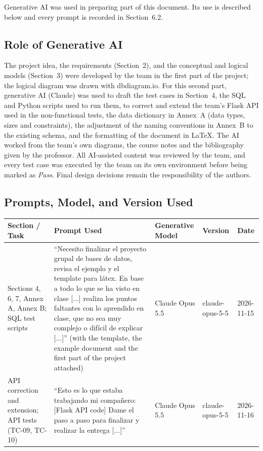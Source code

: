 \documentclass[11pt]{article}
\renewcommand{\_}{\oldunderscore\allowbreak}
\begin{document}
Generative AI was used in preparing part of this document. Its use is described below and every prompt is recorded in Section~6.2.

\subsection{Role of Generative AI}
The project idea, the requirements (Section~2), and the conceptual and logical models (Section~3) were developed by the team in the first part of the project; the logical diagram was drawn with dbdiagram.io. For this second part, generative AI (Claude) was used to draft the test cases in Section~4, the SQL and Python scripts used to run them, to correct and extend the team's Flask API used in the non-functional tests, the data dictionary in Annex~A (data types, sizes and constraints), the adjustment of the naming conventions in Annex~B to the existing schema, and the formatting of the document in \LaTeX{}. The AI worked from the team's own diagrams, the course notes and the bibliography given by the professor. All AI-assisted content was reviewed by the team, and every test case was executed by the team on its own environment before being marked as \textit{Pass}. Final design decisions remain the responsibility of the authors.

\subsection{Prompts, Model, and Version Used}

{\small
\begin{longtable}{@{}L{2.6cm}L{5.2cm}L{2.4cm}L{2.1cm}L{1.9cm}@{}}
\toprule
\textbf{Section / Task} & \textbf{Prompt Used} & \textbf{Generative Model} & \textbf{Version} & \textbf{Date} \\
\midrule
\endhead
Sections 4, 6, 7, Annex A, Annex B; SQL test scripts & ``Necesito finalizar el proyecto grupal de bases de datos, revisa el ejemplo y el template para látex. En base a todo lo que se ha visto en clase [...] realiza los puntos faltantes con lo aprendido en clase, que no sea muy complejo o difícil de explicar [...]'' (with the template, the example document and the first part of the project attached) & Claude Opus 5.5 & claude-opus-5-5 & 2026-11-15 \\[0.6em]
API correction and extension; API tests (TC-09, TC-10) & ``Esto es lo que estaba trabajando mi compañero: [Flask API code] Dame el paso a paso para finalizar y realizar la entrega [...]'' & Claude Opus 5.5 & claude-opus-5-5 & 2026-11-16 \\[0.6em]
\bottomrule
\end{longtable}
}
\end{document}
